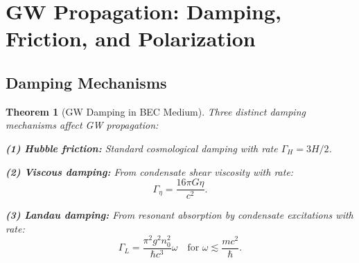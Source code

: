 \documentclass[11pt,a4paper]{article}
\newtheorem{theorem}{Theorem}[section]
\theoremstyle{definition}
\theoremstyle{remark}
\begin{document}
\section{GW Propagation: Damping, Friction, and Polarization}
\label{sec:propagation}

\subsection{Damping Mechanisms}
\label{sec:damping}

\begin{theorem}[GW Damping in BEC Medium]
\label{thm:damping}
Three distinct damping mechanisms affect GW propagation:

\textbf{(1) Hubble friction:} Standard cosmological damping with rate $\Gamma_H = 3H/2$.

\textbf{(2) Viscous damping:} From condensate shear viscosity with rate:
\begin{equation}
\Gamma_\eta = \frac{16\pi G\eta}{c^2}.
\end{equation}

\textbf{(3) Landau damping:} From resonant absorption by condensate excitations with rate:
\begin{equation}
\Gamma_L = \frac{\pi^2 g^2 n_0^2}{\hbar c^3}\omega \quad \text{for } \omega \lesssim \frac{mc^2}{\hbar}.
\end{equation}
\end{theorem}
\end{document}
